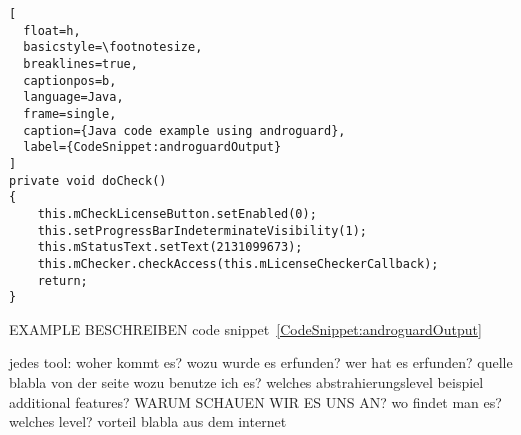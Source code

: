 \begin{lstlisting}[
  float=h,
  basicstyle=\footnotesize,
  breaklines=true,
  captionpos=b,
  language=Java,
  frame=single,
  caption={Java code example using androguard},
  label={CodeSnippet:androguardOutput}
]
private void doCheck()
{
    this.mCheckLicenseButton.setEnabled(0);
    this.setProgressBarIndeterminateVisibility(1);
    this.mStatusText.setText(2131099673);
    this.mChecker.checkAccess(this.mLicenseCheckerCallback);
    return;
}
\end{lstlisting}
EXAMPLE BESCHREIBEN code snippet~\ref{CodeSnippet:androguardOutput}


jedes tool:\newline
woher kommt es?\newline
wozu wurde es erfunden?\newline
wer hat es erfunden? quelle\newline
blabla von der seite\newline
wozu benutze ich es?\newline
welches abstrahierungslevel\newline
beispiel\newline
additional features?\newline
WARUM SCHAUEN WIR ES UNS AN?\newline
wo findet man es?\newline
welches level?\newline
vorteil\newline
blabla aus dem internet\newline
